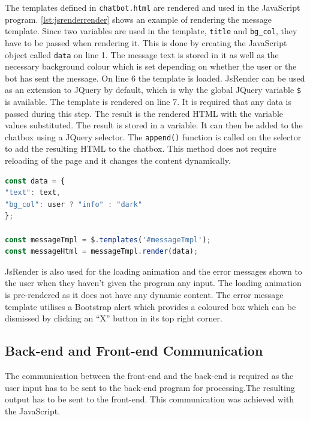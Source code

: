 \documentclass[12pt,a4paper]{article}
\newcommand{\captionstyle}[1] {
    \small{#1}
}
\begin{document}
The templates defined in \texttt{chatbot.html} are rendered and used in the JavaScript program. \cref{lst:jsrenderrender} shows an example of rendering the message template. Since two variables are used in the template, \texttt{title} and \texttt{bg\_col}, they have to be passed when rendering it. This is done by creating the JavaScript object called \texttt{data} on line 1. The message text is stored in it as well as the necessary background colour which is set depending on whether the user or the bot has sent the message. On line 6 the template is loaded. JsRender can be used as an extension to JQuery by default, which is why the global JQuery variable \texttt{\$} is available. The template is rendered on line 7. It is required that any data is passed during this step. The result is the rendered HTML with the variable values substituted. The result is stored in a variable. It can then be added to the chatbox using a JQuery selector. The \texttt{append()} function is called on the selector to add the resulting HTML to the chatbox. This method does not require reloading of the page and it changes the content dynamically. 

\begin{lstlisting}[language=JavaScript, caption={\captionstyle{Rendering the JsRender message template.}}, label={lst:jsrenderrender}]
const data = {
"text": text,
"bg_col": user ? "info" : "dark"
};

const messageTmpl = $.templates('#messageTmpl');
const messageHtml = messageTmpl.render(data);
\end{lstlisting}

JsRender is also used for the loading animation and the error messages shown to the user when they haven’t given the program any input. The loading animation is pre-rendered as it does not have any dynamic content. The error message template utilises a Bootstrap alert which provides a coloured box which can be dismissed by clicking an “X” button in its top right corner. 

\subsection{Back-end and Front-end Communication}
The communication between the front-end and the back-end is required as the user input has to be sent to the back-end program for processing.The resulting output has to be sent to the front-end. This communication was achieved with the JavaScript. 
\end{document}
